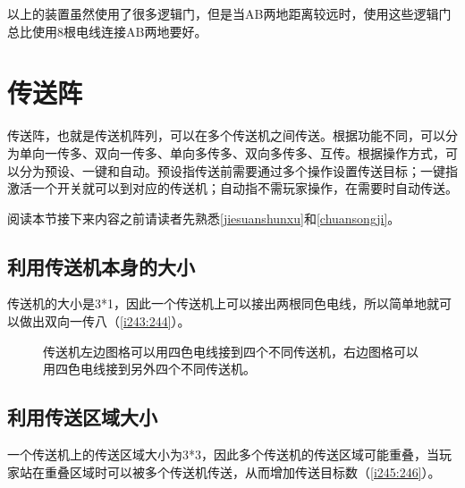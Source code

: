 以上的装置虽然使用了很多逻辑门，但是当AB两地距离较远时，使用这些逻辑门总比使用8根电线连接AB两地要好。

\section{传送阵}
传送阵，也就是传送机阵列，可以在多个传送机之间传送。根据功能不同，可以分为单向一传多、双向一传多、单向多传多、双向多传多、互传。根据操作方式，可以分为预设、一键和自动。预设指传送前需要通过多个操作设置传送目标；一键指激活一个开关就可以到对应的传送机；自动指不需玩家操作，在需要时自动传送。

阅读本节接下来内容之前请读者先熟悉\autoref{jiesuanshunxu}和\autoref{chuansongji}。

\subsection{利用传送机本身的大小}
传送机的大小是3*1，因此一个传送机上可以接出两根同色电线，所以简单地就可以做出双向一传八（\autoref{i243:244}）。

\begin{figure}[!h]
\begin{center}
\qquad
{}
\end{center}
\caption{传送机左边图格可以用四色电线接到四个不同传送机，右边图格可以用四色电线接到另外四个不同传送机。}
\label{i243:244}
\end{figure}

\subsection{利用传送区域大小}
一个传送机上的传送区域大小为3*3，因此多个传送机的传送区域可能重叠，当玩家站在重叠区域时可以被多个传送机传送，从而增加传送目标数（\autoref{i245:246}）。

